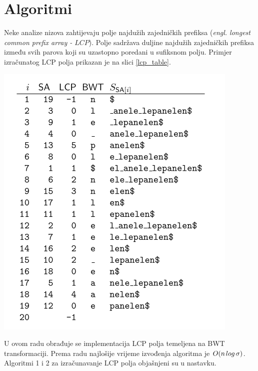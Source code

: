 \documentclass[times, utf8, seminar, numeric]{fer}
\begin{document}
\section{Algoritmi}

Neke analize nizova zahtijevaju polje najdužih zajedničkih prefiksa (\textit{engl. longest common prefix array - $LCP$}). Polje sadržava duljine najdužih zajedničkih prefiksa između svih parova koji su uzastopno poredani u sufiksnom polju. Primjer izračunatog LCP polja prikazan je na slici \ref{lcp_table}.



\begin{center}
	\includegraphics[scale=0.5]{slike/lcp_table_2.png}
	\label{lcp_table}
\end{center}


U ovom radu obrađuje se implementacija LCP polja temeljena na BWT transformaciji. Prema radu\cite{Beller2011} najlošije vrijeme izvođenja algoritma je $ O(n\hspace{0.5mm} log \hspace{0.5mm} \sigma) $. Algoritmi 1 i 2 za  izračunavanje LCP polja objašnjeni su u nastavku.
\end{document}
